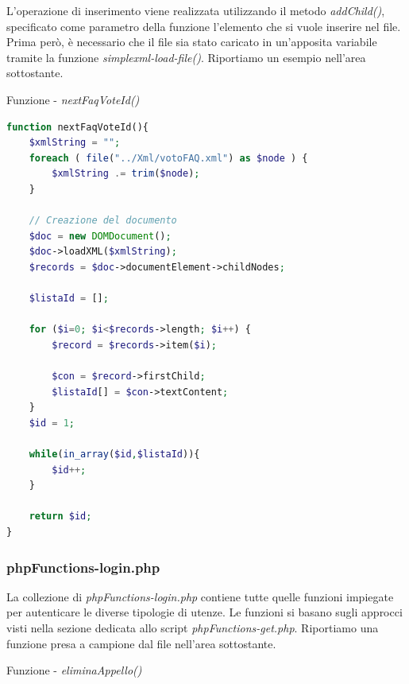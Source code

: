 \documentclass [a4paper,11pt]{book}
\begin{document}
\medskip

L'operazione di inserimento viene realizzata utilizzando il metodo \emph{addChild()}, specificato come parametro della funzione l'elemento che si vuole inserire nel file. Prima però, è necessario che il file sia stato caricato in un'apposita variabile tramite la funzione \emph{simplexml-load-file()}.
Riportiamo un esempio nell'area sottostante.

\medskip

Funzione - \emph{nextFaqVoteId()} 

\medskip

\begin{lstlisting}[language=PHP]
function nextFaqVoteId(){
    $xmlString = "";
    foreach ( file("../Xml/votoFAQ.xml") as $node ) {
        $xmlString .= trim($node);
    }
         
    // Creazione del documento
    $doc = new DOMDocument();
    $doc->loadXML($xmlString);
    $records = $doc->documentElement->childNodes;
     
    $listaId = [];
     
    for ($i=0; $i<$records->length; $i++) { 
        $record = $records->item($i);
             
        $con = $record->firstChild;
        $listaId[] = $con->textContent;
    }
    $id = 1;

    while(in_array($id,$listaId)){
        $id++;
    }
    
    return $id;
}
\end{lstlisting}

\medskip

\subsubsection{phpFunctions-login.php}

La collezione di \emph{phpFunctions-login.php} contiene tutte quelle funzioni impiegate per autenticare le diverse tipologie di utenze. Le funzioni si basano sugli approcci visti nella sezione dedicata allo script \emph{phpFunctions-get.php}.
Riportiamo una funzione presa a campione dal file nell'area sottostante.

\medskip

Funzione - \emph{eliminaAppello()} 

\medskip
\end{document}

